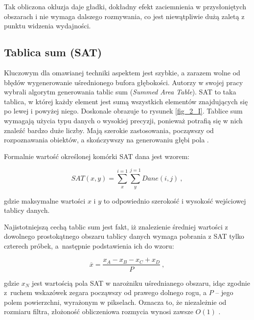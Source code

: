 	Tak obliczona okluzja daje gładki, dokładny efekt zaciemnienia w przysłoniętych obszarach i nie wymaga dalszego rozmywania, co jest niewątpliwie dużą zaletą z punktu widzenia wydajności.
	
		\subsection{Tablica sum (SAT)}
		\label{t:teoria:statvo:sat}
		
		Kluczowym dla omawianej techniki aspektem jest szybkie, a zarazem wolne od błędów wygenerowanie uśrednionego bufora głębokości. Autorzy \cite{statvo} w swojej pracy wybrali algorytm generowania tablic sum (\emph{Summed Area Table}). SAT to taka tablica, w której każdy element jest sumą wszystkich elementów znajdujących się po lewej i powyżej niego. Doskonale obrazuje to rysunek \ref{fig_2_I}. Tablice sum wymagają użycia typu danych o wysokiej precyzji, ponieważ potrafią się w nich znaleźć bardzo duże liczby. Mają szerokie zastosowania, począwszy od rozpoznawania obiektów, a skończywszy na generowaniu głębi pola \cite{sat}.
		
		
		Formalnie wartość określonej komórki SAT dana jest wzorem:
		
		\begin{equation}
		\mathit{SAT}(x, y) = \sum_{x}^{i=1}\sum_{y}^{j=1}\mathit{Dane}(i, j)\ ,
		\end{equation}
		
		gdzie maksymalne wartości \(x\) i \(y\) to odpowiednio szerokość i wysokość wejściowej tablicy danych.
		
		Najistotniejszą cechą tablic sum jest fakt, iż znalezienie średniej wartości z dowolnego prostokątnego obszaru tablicy danych wymaga pobrania z SAT tylko czterech próbek, a~następnie podstawienia ich do wzoru:
		
		\begin{equation}
		\overline{x} = \frac{x_{A} - x_{B} - x_{C} + x_{D}}{P}\ ,
		\end{equation}
		
		gdzie \(x_{N}\) jest wartością pola SAT w narożniku uśrednianego obszaru, idąc zgodnie z~ruchem wskazówek zegara począwszy od prawego dolnego rogu, a \(P\) -- jego polem powierzchni, wyrażonym w pikselach. Oznacza to, że niezależnie od rozmiaru filtra, złożoność obliczeniowa rozmycia wynosi zawsze \(O(1)\) \cite{sat}.
		
